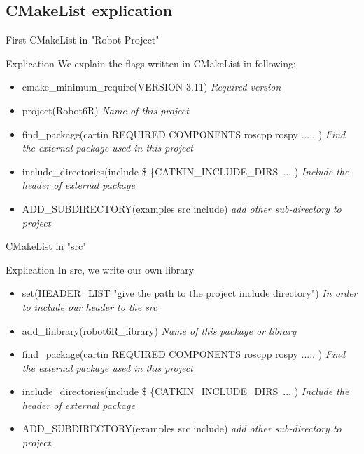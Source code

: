 \documentclass[10 pt]{beamer}
\begin{document}
\subsection{CMakeList explication}

\begin{frame}{First CMakeList in "Robot Project"}
\begin{exampleblock}{Explication}
We explain the flags written in CMakeList in following: 
\end{exampleblock}
\begin{itemize}
	\item  cmake\_minimum\_require(VERSION 3.11)    \textit{Required version}
	\item  project(Robot6R)   				 \textit{Name of this project}
	\item find\_package(cartin REQUIRED COMPONENTS roscpp rospy ..... )  \textit{Find the external package used in this project }
	\item include\_directories(include \$ \{CATKIN\_INCLUDE\_DIRS\ ... )  \textit{Include the header of external package }
    \item ADD\_SUBDIRECTORY(examples src include) \textit{ add other sub-directory to project }
\end{itemize}
\end{frame}

\begin{frame}{CMakeList in "src"}
\begin{exampleblock}{Explication}
In src, we write our own library 
\end{exampleblock}
\begin{itemize}
	\item  set(HEADER\_LIST "give the path to the project include directory")   \textit{In order to include our header to the src}
	\item  add\_linbrary(robot6R\_library)  				 \textit{Name of this package or library}
	\item find\_package(cartin REQUIRED COMPONENTS roscpp rospy ..... )  \textit{Find the external package used in this project }
	\item include\_directories(include \$ \{CATKIN\_INCLUDE\_DIRS\ ... )  \textit{Include the header of external package }
	\item ADD\_SUBDIRECTORY(examples src include) \textit{ add other sub-directory to project }
\end{itemize}
\end{frame}
\end{document}
